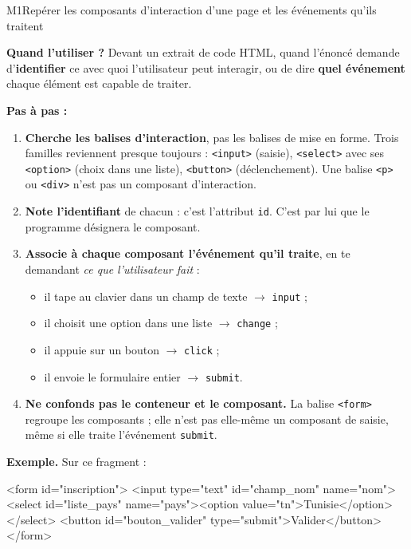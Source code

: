 \begin{fichemethode}{M1}{Repérer les composants d'interaction d'une page et les événements qu'ils traitent}

\textbf{Quand l'utiliser ?} Devant un extrait de code HTML, quand l'énoncé demande
d'\textbf{identifier} ce avec quoi l'utilisateur peut interagir, ou de dire \textbf{quel
événement} chaque élément est capable de traiter.

\textbf{Pas à pas :}
\begin{enumerate}
  \item \textbf{Cherche les balises d'interaction}, pas les balises de mise en forme.
        Trois familles reviennent presque toujours :
        \lstinline{<input>} (saisie), \lstinline{<select>} avec ses \lstinline{<option>}
        (choix dans une liste), \lstinline{<button>} (déclenchement).
        Une balise \lstinline{<p>} ou \lstinline{<div>} n'est pas un composant d'interaction.
  \item \textbf{Note l'identifiant} de chacun : c'est l'attribut \lstinline{id}. C'est par lui
        que le programme désignera le composant.
  \item \textbf{Associe à chaque composant l'événement qu'il traite}, en te demandant
        \emph{ce que l'utilisateur fait} :
        \begin{itemize}
          \item il tape au clavier dans un champ de texte $\rightarrow$ \lstinline{input} ;
          \item il choisit une option dans une liste $\rightarrow$ \lstinline{change} ;
          \item il appuie sur un bouton $\rightarrow$ \lstinline{click} ;
          \item il envoie le formulaire entier $\rightarrow$ \lstinline{submit}.
        \end{itemize}
  \item \textbf{Ne confonds pas le conteneur et le composant.} La balise \lstinline{<form>}
        regroupe les composants ; elle n'est pas elle-même un composant de saisie, même si
        elle traite l'événement \lstinline{submit}.
\end{enumerate}

\textbf{Exemple.} Sur ce fragment :
\begin{console}
<form id="inscription">
    <input type="text" id="champ_nom" name="nom">
    <select id="liste_pays" name="pays"><option value="tn">Tunisie</option></select>
    <button id="bouton_valider" type="submit">Valider</button>
</form>
\end{console}


\end{fichemethode}
